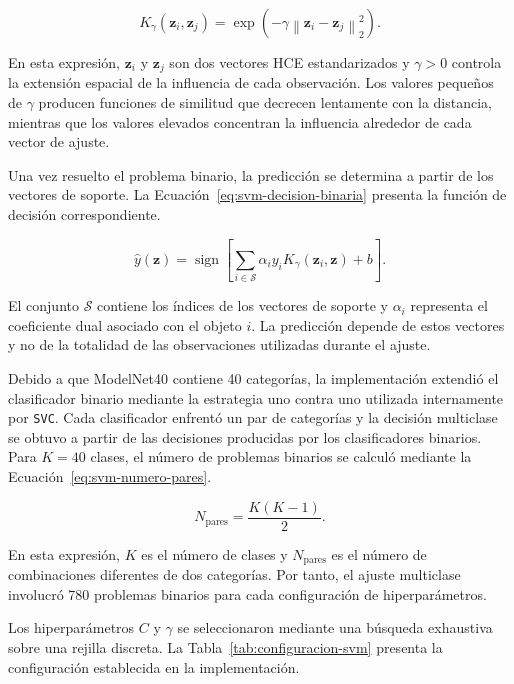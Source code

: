 \begin{equation}
K_{\gamma}(\mathbf z_i,\mathbf z_j)
=
\exp
\left(
-\gamma
\left\|
\mathbf z_i-\mathbf z_j
\right\|_2^2
\right).
\label{eq:svm-kernel-rbf}
\end{equation}

En esta expresión, $\mathbf z_i$ y $\mathbf z_j$ son dos vectores HCE estandarizados y $\gamma>0$ controla la extensión espacial de la influencia de cada observación. Los valores pequeños de $\gamma$ producen funciones de similitud que decrecen lentamente con la distancia, mientras que los valores elevados concentran la influencia alrededor de cada vector de ajuste.

Una vez resuelto el problema binario, la predicción se determina a partir de los vectores de soporte. La Ecuación~\eqref{eq:svm-decision-binaria} presenta la función de decisión correspondiente.

\begin{equation}
\widehat y(\mathbf z)
=
\operatorname{sign}
\left[
\sum_{i\in\mathcal S}
\alpha_i y_i
K_{\gamma}(\mathbf z_i,\mathbf z)
+b
\right].
\label{eq:svm-decision-binaria}
\end{equation}

El conjunto $\mathcal S$ contiene los índices de los vectores de soporte y $\alpha_i$ representa el coeficiente dual asociado con el objeto $i$. La predicción depende de estos vectores y no de la totalidad de las observaciones utilizadas durante el ajuste.

Debido a que ModelNet40 contiene 40 categorías, la implementación extendió el clasificador binario mediante la estrategia uno contra uno utilizada internamente por \texttt{SVC}. Cada clasificador enfrentó un par de categorías y la decisión multiclase se obtuvo a partir de las decisiones producidas por los clasificadores binarios. Para $K=40$ clases, el número de problemas binarios se calculó mediante la Ecuación~\eqref{eq:svm-numero-pares}.

\begin{equation}
N_{\mathrm{pares}}
=
\frac{K(K-1)}{2}.
\label{eq:svm-numero-pares}
\end{equation}

En esta expresión, $K$ es el número de clases y $N_{\mathrm{pares}}$ es el número de combinaciones diferentes de dos categorías. Por tanto, el ajuste multiclase involucró 780 problemas binarios para cada configuración de hiperparámetros.

Los hiperparámetros $C$ y $\gamma$ se seleccionaron mediante una búsqueda exhaustiva sobre una rejilla discreta. La Tabla~\ref{tab:configuracion-svm} presenta la configuración establecida en la implementación.

